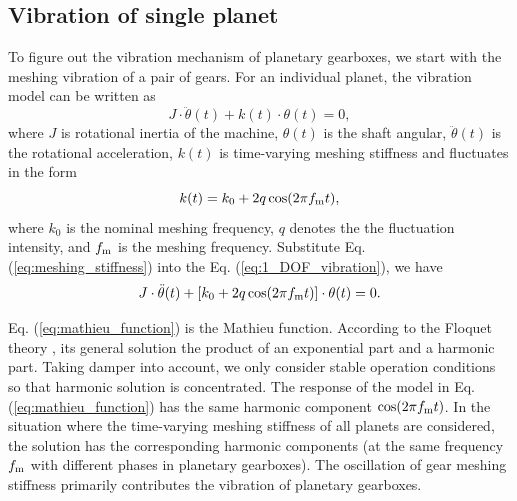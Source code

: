 \documentclass[a4paper,fleqn]{cas-sc}%
\begin{document}
\subsection{Vibration of single planet}
\par To figure out the vibration mechanism of planetary gearboxes, we start with the meshing vibration of a pair of gears. For an individual planet, the vibration model can be written as
\begin{equation}
    J \cdot \ddot{\theta}(t) + k(t) \cdot \theta(t) = 0 \label{eq:1_DOF_vibration},
\end{equation}
where \(J\) is rotational inertia of the machine, \(\theta(t)\) is the shaft angular, \(\ddot{\theta}(t)\) is the rotational acceleration, \(k(t)\) is time-varying meshing stiffness and fluctuates in the form
\begin{equation}
    k(t)=k_0+2 q \cos(2 \pi f_{\rm m} t) \label{eq:meshing_stiffness},
\end{equation}
where \(k_0\) is the nominal meshing frequency, \(q\) denotes the the fluctuation intensity, and \(f_{\rm m}\) is the meshing frequency. Substitute Eq. (\ref{eq:meshing_stiffness}) into the Eq. (\ref{eq:1_DOF_vibration}), we have
\begin{equation}
    J \cdot \ddot{\theta}(t) + \left[k_0+2 q \cos(2 \pi f_{\rm m} t)\right] \cdot \theta(t) = 0. \label{eq:mathieu_function}
\end{equation}
\par Eq. (\ref{eq:mathieu_function}) is the Mathieu function. According to the Floquet theory \cite{Arscott2014}, its general solution the product of an exponential part and a harmonic part. Taking damper into account, we only consider stable operation conditions so that harmonic solution is concentrated. The response of the model in Eq. (\ref{eq:mathieu_function}) has the same harmonic component \(\cos(2 \pi f_{\rm m} t)\). In the situation where the time-varying meshing stiffness of all planets are considered, the solution has the corresponding harmonic components (at the same frequency \(f_{\rm m}\) with different phases in planetary gearboxes).
The oscillation of gear meshing stiffness primarily contributes the vibration of planetary gearboxes.
\end{document}
